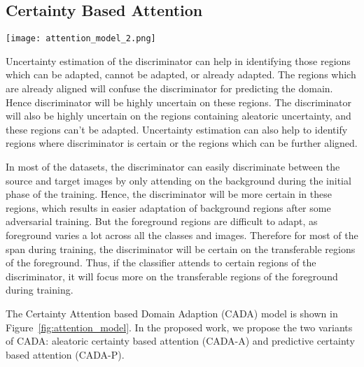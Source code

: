 \documentclass[10pt,twocolumn,letterpaper]{article}
\begin{document}
\subsection{Certainty Based Attention}
\begin{figure*}[!ht]
     \centering
       \texttt{[image: attention\_model\_2.png]}
  \caption{The architecture of Certainty based Attention for Domain Adaptation (CADA), consists of a shared feature extractor, Bayesian classifier and Bayesian discriminator where both the classifier and discriminator predict the variance value along with the prediction score. Discriminator's predictive or aleatoric uncertainty is used to highlight the regions where the discriminator is certain about its predictions.}
      \label{fig:attention_model}
      \vspace{-0.7em}
 \end{figure*}
Uncertainty estimation of the discriminator can help in identifying those regions which can be adapted, cannot be adapted, or already adapted.
The regions which are already aligned will confuse the discriminator for predicting the domain. Hence discriminator will be highly uncertain on these regions. The discriminator will also be highly uncertain on the regions containing aleatoric uncertainty, and these regions can't be adapted. Uncertainty estimation can also help to identify regions where discriminator is certain or the regions which can be further aligned.

 In most of the datasets, the discriminator can easily discriminate between the source and target images by only attending on the background during the initial phase of the training. Hence, the discriminator will be more certain in these regions, which results in easier adaptation of background regions after some adversarial training. But the foreground regions are difficult to adapt, as foreground varies a lot across all the classes and images. Therefore for most of the span during training, the discriminator will be certain on the transferable regions of the foreground. Thus, if the classifier attends to certain regions of the discriminator, it will focus more on the transferable regions of the foreground during training. 
 
The Certainty Attention based Domain Adaption (CADA) model is shown in Figure~\ref{fig:attention_model}. In the proposed work, we propose the two variants of CADA: aleatoric certainty based attention (CADA-A) and predictive certainty based attention (CADA-P). 
 
\end{document}
